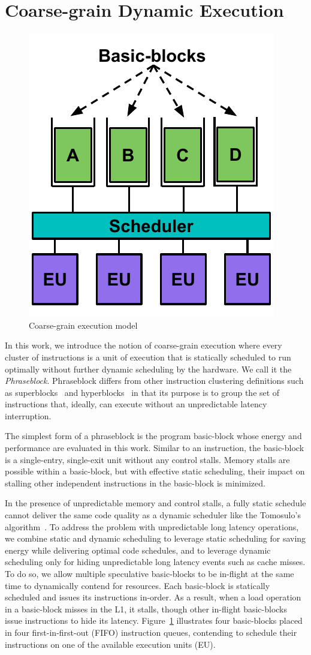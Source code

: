 \section{Coarse-grain Dynamic Execution}
\label{sec:course_grain}

\begin{figure}
	\centering
	\includegraphics[width=0.5\columnwidth]{fig/coarse_grain_sch.pdf} 
	\caption{Coarse-grain execution model}
	\label{fig:coarse_grain_sch}
\end{figure}

In this work, we introduce the notion of coarse-grain execution where every
cluster of instructions is a unit of execution that is statically scheduled to
run optimally without further dynamic scheduling by the hardware. We call it the
{\it{Phraseblock}}. Phraseblock differs from other instruction clustering
definitions such as superblocks~\cite{superblock} and
hyperblocks~\cite{hyperblock} in that its purpose is to group the set of
instructions that, ideally, can execute without an unpredictable latency
interruption. 

The simplest form of a phraseblock is the program basic-block whose energy and
performance are evaluated in this work. Similar to an instruction, the
basic-block is a single-entry, single-exit unit without any control stalls.
Memory stalls are possible within a basic-block, but with effective static
scheduling, their impact on stalling other independent instructions in the
basic-block is minimized.

In the presence of unpredictable memory and control stalls, a fully static
schedule cannot deliver the same code quality as a dynamic scheduler like the
Tomosulo's algorithm~\cite{tomasulo}. To address the problem with unpredictable
long latency operations, we combine static and dynamic scheduling to leverage
static scheduling for saving energy while delivering optimal code schedules, and
to leverage dynamic scheduling only for hiding unpredictable long latency events
such as cache misses. To do so, we allow multiple speculative basic-blocks to be
in-flight at the same time to dynamically contend for resources.  Each
basic-block is statically scheduled and issues its instructions in-order.  As a
result, when a load operation in a basic-block misses in the L1, it stalls,
    though other in-flight basic-blocks issue instructions to hide its latency.
    Figure~\ref{fig:coarse_grain_sch} illustrates four basic-blocks placed in
    four first-in-first-out (FIFO) instruction queues, contending to schedule
    their instructions on one of the available execution units (EU).
